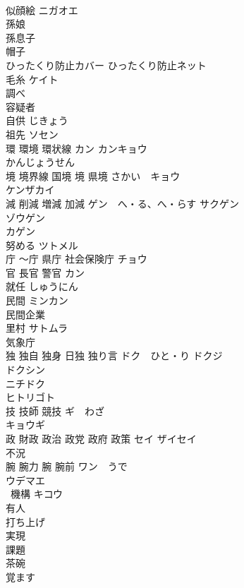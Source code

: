 \documentclass[8pt]{extreport}
\begin{document}
\begin{CJK}{UTF8}{min}
\\	似顔絵	ニガオエ 
\\	孫娘
\\	孫息子	
\\	帽子	
\\	ひったくり防止カバー ひったくり防止ネット	
\\	毛糸	ケイト 
\\	調べ	
\\	容疑者	
\\	自供	じきょう 
\\	祖先	ソセン 
\\	環 環境 環状線	カン カンキョウ 
\\	かんじょうせん 
\\	境 境界線 国境 境 県境	さかい　キョウ 
\\	ケンザカイ 
\\	減 削減 増減 加減	ゲン　へ・る、へ・らす サクゲン　
\\	ゾウゲン 
\\	カゲン 
\\	努める	ツトメル 
\\	庁 〜庁 県庁 社会保険庁	チョウ 
\\	官 長官 警官	カン 
\\	就任	しゅうにん 
\\	民間	ミンカン 
\\	民間企業　
\\	里村	サトムラ
\\	気象庁	
\\	独 独自 独身 日独 独り言	ドク　ひと・り ドクジ 
\\	ドクシン 
\\	ニチドク 
\\	ヒトリゴト 
\\	技 技師 競技	ギ　わざ 
\\	キョウギ 
\\	政 財政 政治 政党 政府 政策	セイ ザイセイ　
\\	不況	
\\	腕 腕力 腕 腕前	ワン　うで 
\\	ウデマエ 
\\	~機構	キコウ 
\\	有人	
\\	打ち上げ	
\\	実現	
\\	課題	
\\	茶碗	
\\	覚ます	
\end{CJK}
\end{document}
